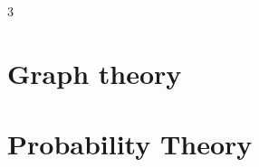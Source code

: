 \documentclass[8pt, a4paper]{extarticle}
\author{Timofey Shatnyy}
\begin{document}
\begin{multicols}{3}
    \section{Graph theory}
    \setcounter{subsection}{3}
    
    
    
    \newpage
    \section{Probability Theory}
    
    
    \newpage
    
    
\end{multicols}
\end{document}
